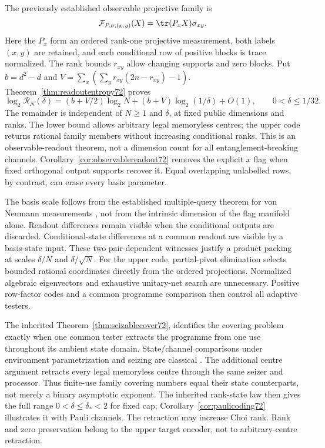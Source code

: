 The previously established observable projective family is
\[
 \mathcal F_{P,\sigma,(x,y)}(X)=\tr(P_xX)\sigma_{xy}.
\]
Here the $P_x$ form an ordered rank-one projective measurement, both
labels $(x,y)$ are retained, and each conditional row of positive
blocks is trace normalized. The rank bounds $r_{xy}$ allow changing
supports and zero blocks. Put $b=d^2-d$ and
$V=\sum_x(\sum_y r_{xy}(2n-r_{xy})-1)$.
Theorem~\ref{thm:readoutentropy72} proves
\[
 \log_2\mathcal R_N(\delta)
  =(b+V/2)\log_2N+(b+V)\log_2(1/\delta)+O(1),
 \qquad 0<\delta\le1/32.
\]
The remainder is independent of $N\ge1$ and $\delta$, at fixed
public dimensions and ranks. The lower bound allows arbitrary legal
memoryless centres; the upper code returns rational family members
without increasing conditional ranks. This is an observable-readout
theorem, not a dimension count for all entanglement-breaking channels.
Corollary~\ref{cor:observablereadout72} removes the explicit $x$ flag
when fixed orthogonal output supports recover it. Equal overlapping
unlabelled rows, by contrast, can erase every basis parameter.

The basis scale follows from the established multiple-query theorem
for von Neumann measurements \cite{PPKKO72}, not from the intrinsic
dimension of the flag manifold alone. Readout differences remain
visible when the conditional outputs are discarded. Conditional-state
differences at a common readout are visible by a basis-state input.
These two pair-dependent witnesses justify a product packing at scales
$\delta/N$ and $\delta/\sqrt N$. For the upper code, partial-pivot
elimination selects bounded rational coordinates directly from the
ordered projections. Normalized algebraic eigenvectors and exhaustive
unitary-net search are unnecessary. Positive row-factor codes and a
common programme comparison then control all adaptive testers.

The inherited Theorem~\ref{thm:seizablecover72}, identifies the
covering problem exactly when one common tester extracts the programme
from one use throughout its ambient state domain. State/channel
comparisons under environment parametrization and seizing are classical
\cite{DW72,WBHK72,WW72}. The additional centre argument retracts every
legal memoryless centre through the same seizer and processor. Thus
finite-use family covering numbers equal their state counterparts,
not merely a binary asymptotic exponent. The inherited rank-state law
then gives the full range $0<\delta\le\delta_*<2$ for fixed cap;
Corollary~\ref{cor:paulicoding72} illustrates it with Pauli channels.
The retraction may increase Choi rank. Rank and zero preservation
belong to the upper target encoder, not to arbitrary-centre retraction.

